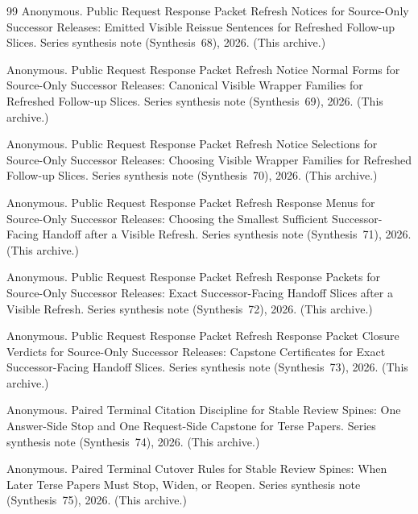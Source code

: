 \documentclass[11pt]{article}
\begin{document}
\begin{thebibliography}{99}
Anonymous.
\newblock Public Request Response Packet Refresh Notices for Source-Only Successor Releases: Emitted Visible Reissue Sentences for Refreshed Follow-up Slices.
\newblock Series synthesis note (Synthesis~68), 2026. (This archive.)

Anonymous.
\newblock Public Request Response Packet Refresh Notice Normal Forms for Source-Only Successor Releases: Canonical Visible Wrapper Families for Refreshed Follow-up Slices.
\newblock Series synthesis note (Synthesis~69), 2026. (This archive.)

Anonymous.
\newblock Public Request Response Packet Refresh Notice Selections for Source-Only Successor Releases: Choosing Visible Wrapper Families for Refreshed Follow-up Slices.
\newblock Series synthesis note (Synthesis~70), 2026. (This archive.)

Anonymous.
\newblock Public Request Response Packet Refresh Response Menus for Source-Only Successor Releases: Choosing the Smallest Sufficient Successor-Facing Handoff after a Visible Refresh.
\newblock Series synthesis note (Synthesis~71), 2026. (This archive.)

Anonymous.
\newblock Public Request Response Packet Refresh Response Packets for Source-Only Successor Releases: Exact Successor-Facing Handoff Slices after a Visible Refresh.
\newblock Series synthesis note (Synthesis~72), 2026. (This archive.)


Anonymous.
\newblock Public Request Response Packet Refresh Response Packet Closure Verdicts for Source-Only Successor Releases: Capstone Certificates for Exact Successor-Facing Handoff Slices.
\newblock Series synthesis note (Synthesis~73), 2026. (This archive.)

Anonymous.
\newblock Paired Terminal Citation Discipline for Stable Review Spines: One Answer-Side Stop and One Request-Side Capstone for Terse Papers.
\newblock Series synthesis note (Synthesis~74), 2026. (This archive.)

Anonymous.
\newblock Paired Terminal Cutover Rules for Stable Review Spines: When Later Terse Papers Must Stop, Widen, or Reopen.
\newblock Series synthesis note (Synthesis~75), 2026. (This archive.)


\end{thebibliography}
\end{document}
